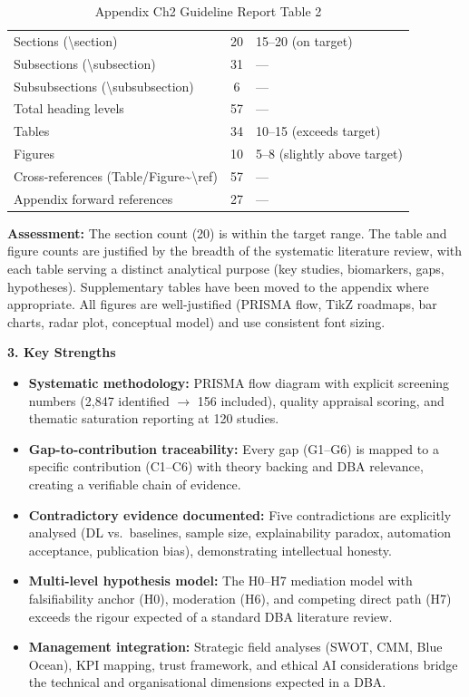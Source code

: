 \begin{table}[H]
\tablefontsize
\caption{Appendix Ch2 Guideline Report Table 2}
\tablestripes
\begin{tabularx}{\textwidth}{@{} l c L @{}}
\toprule
{} &  &  \\
\midrule
Sections (\textbackslash section) & 20 & 15--20 (on target) \\
Subsections (\textbackslash subsection) & 31 & --- \\
Subsubsections (\textbackslash subsubsection) & 6 & --- \\
Total heading levels & 57 & --- \\
Tables & 34 & 10--15 (exceeds target) \\
Figures & 10 & 5--8 (slightly above target) \\
Cross-references (Table/Figure\textasciitilde\textbackslash ref) & 57 & --- \\
Appendix forward references & 27 & --- \\
\bottomrule
\end{tabularx}
\end{table}

\noindent\textbf{Assessment:} The section count (20) is within the target range. The table and figure counts are justified by the breadth of the systematic literature review, with each table serving a distinct analytical purpose (key studies, biomarkers, gaps, hypotheses). Supplementary tables have been moved to the appendix where appropriate. All figures are well-justified (PRISMA flow, TikZ roadmaps, bar charts, radar plot, conceptual model) and use consistent font sizing.

\noindent\textbf{\color{ggunavy}3. Key Strengths}

\begin{itemize}[nosep]
\item \textbf{Systematic methodology:} PRISMA flow diagram with explicit screening numbers (2,847 identified $\to$ 156 included), quality appraisal scoring, and thematic saturation reporting at 120 studies.
\item \textbf{Gap-to-contribution traceability:} Every gap (G1--G6) is mapped to a specific contribution (C1--C6) with theory backing and DBA relevance, creating a verifiable chain of evidence.
\item \textbf{Contradictory evidence documented:} Five contradictions are explicitly analysed (DL vs.\ baselines, sample size, explainability paradox, automation acceptance, publication bias), demonstrating intellectual honesty.
\item \textbf{Multi-level hypothesis model:} The H0--H7 mediation model with falsifiability anchor (H0), moderation (H6), and competing direct path (H7) exceeds the rigour expected of a standard DBA literature review.
\item \textbf{Management integration:} Strategic field analyses (SWOT, CMM, Blue Ocean), KPI mapping, trust framework, and ethical AI considerations bridge the technical and organisational dimensions expected in a DBA.
\end{itemize}

